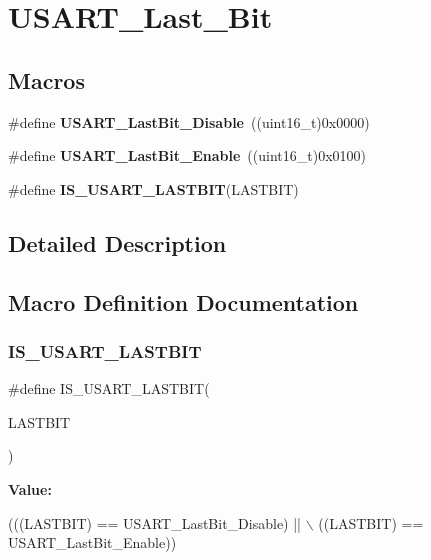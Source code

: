 \section{U\+S\+A\+R\+T\+\_\+\+Last\+\_\+\+Bit}
\label{group__USART__Last__Bit}
\subsection*{Macros}
\begin{DoxyCompactItemize}
\item 
\#define \textbf{ U\+S\+A\+R\+T\+\_\+\+Last\+Bit\+\_\+\+Disable}~((uint16\+\_\+t)0x0000)
\item 
\#define \textbf{ U\+S\+A\+R\+T\+\_\+\+Last\+Bit\+\_\+\+Enable}~((uint16\+\_\+t)0x0100)
\item 
\#define \textbf{ I\+S\+\_\+\+U\+S\+A\+R\+T\+\_\+\+L\+A\+S\+T\+B\+IT}(L\+A\+S\+T\+B\+IT)
\end{DoxyCompactItemize}


\subsection{Detailed Description}


\subsection{Macro Definition Documentation}
\mbox{\label{group__USART__Last__Bit_gaa941695e5612b53e9c2aca6a9fa0d695}} 
\subsubsection{I\+S\+\_\+\+U\+S\+A\+R\+T\+\_\+\+L\+A\+S\+T\+B\+IT}
{\footnotesize\ttfamily \#define I\+S\+\_\+\+U\+S\+A\+R\+T\+\_\+\+L\+A\+S\+T\+B\+IT(\begin{DoxyParamCaption}\item[{}]{L\+A\+S\+T\+B\+IT }\end{DoxyParamCaption})}

{\bfseries Value\+:}
\begin{DoxyCode}
(((LASTBIT) == USART_LastBit_Disable) || \(\backslash\)
                                   ((LASTBIT) == USART_LastBit_Enable))
\end{DoxyCode}


